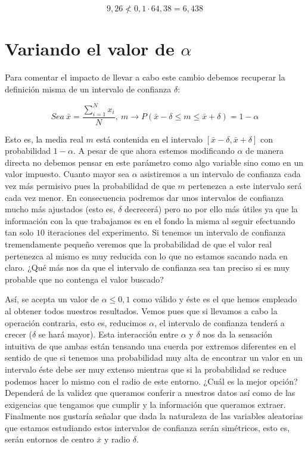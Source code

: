 \documentclass{article}[10pt]
\begin{document}
		$$9,26 \nless 0,1 \cdot 64,38 = 6,438$$

	\section{Variando el valor de $\alpha$}
		Para comentar el impacto de llevar a cabo este cambio debemos recuperar la definición misma de un intervalo de confianza $\delta$:

		$$Sea\ \bar{x} = \frac{\sum_{i = 1}^N x_i}{N}, \ m \rightarrow P(\bar{x} - \delta \leq m \leq \bar{x} + \delta) = 1 - \alpha$$

		Esto es, la media real $m$ está contenida en el intervalo $[\bar{x} - \delta, \bar{x} + \delta]$ con probabilidad $1 - \alpha$. A pesar de que ahora estemos modificando $\alpha$ de manera directa no debemos pensar en este parámetro como algo variable sino como en un valor impuesto. Cuanto mayor sea $\alpha$ asistiremos a un intervalo de confianza cada vez más permisivo pues la probabilidad de que $m$ pertenezca a este intervalo será cada vez menor. En consecuencia podremos dar unos intervalos de confianza mucho más ajustados (esto es, $\delta$ decrecerá) pero no por ello más útiles ya que la información con la que trabajamos es en el fondo la misma al seguir efectuando tan solo $10$ iteraciones del experimento. Si tenemos un intervalo de confianza tremendamente pequeño veremos que la probabilidad de que el valor real pertenezca al mismo es muy reducida con lo que no estamos sacando nada en claro. ¿Qué más nos da que el intervalo de confianza sea tan preciso si es muy probable que no contenga el valor buscado?

		Así, se acepta un valor de $\alpha \leq 0,1$ como válido y éste es el que hemos empleado al obtener todos nuestros resultados. Vemos pues que si llevamos a cabo la operación contraria, esto es, reducimos $\alpha$, el intervalo de confianza tenderá a crecer ($\delta$ se hará mayor). Esta interacción entre $\alpha$ y $\delta$ nos da la sensación intuitiva de que ambas están tensando una cuerda por extremos diferentes en el sentido de que si tenemos una probabilidad muy alta de encontrar un valor en un intervalo éste debe ser muy extenso mientras que si la probabilidad se reduce podemos hacer lo mismo con el radio de este entorno. ¿Cuál es la mejor opción? Dependerá de la validez que queramos conferir a nuestros datos así como de las exigencias que tengamos que cumplir y la información que queramos extraer. Finalmente nos gustaría señalar que dada la naturaleza de las variables aleatorias que estamos estudiando estos intervalos de confianza serán simétricos, esto es, serán entornos de centro $\bar{x}$ y radio $\delta$.
\end{document}
